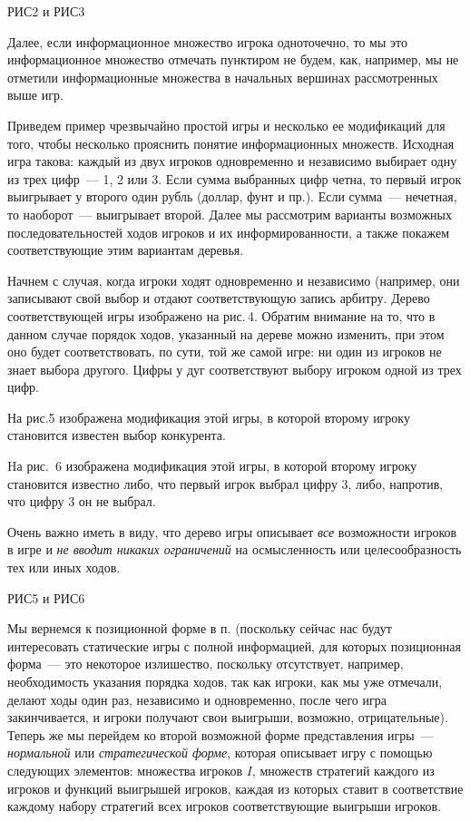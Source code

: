 РИС2 и РИС3



Далее, если информационное множество игрока одноточечно, то мы
это информационное множество отмечать пунктиром не будем, как, например,
мы не отметили информационные множества в начальных вершинах рассмотренных
выше игр.

Приведем пример чрезвычайно простой игры и несколько ее модификаций
для того, чтобы несколько прояснить понятие информационных множеств.
Исходная игра такова: каждый из двух
игроков одновременно и независимо выбирает одну из трех цифр~--- 1, 2 или 3.
Если сумма выбранных цифр четна, то первый игрок выигрывает
у второго один рубль (доллар, фунт и пр.). Если сумма~--- нечетная,
то наоборот~--- выигрывает второй. Далее мы рассмотрим
варианты возможных последовательностей ходов игроков и их информированности,
а также покажем соответствующие этим вариантам деревья.


Начнем с случая, когда игроки ходят одновременно и независимо (например,
они записывают свой выбор и отдают соответствующую запись арбитру.
Дерево соответствующей игры изображено на рис.\,4. Обратим внимание на то, что
в данном случае порядок ходов, указанный на дереве можно изменить, при этом оно
будет соответствовать, по сути, той же самой игре: ни один из игроков не
знает выбора другого. Цифры у дуг соответствуют выбору игроком одной из трех
цифр.

На рис.5 изображена модификация этой игры, в которой второму игроку
становится известен выбор конкурента.

Hа рис.~6 изображена модификация этой игры, в которой второму игроку
становится известно либо, что первый игрок выбрал цифру 3, либо,
напротив, что цифру 3 он не выбрал.

Очень важно иметь в виду, что
дерево игры описывает \emph{все} возможности игроков в игре и \emph{не вводит
никаких ограничений} на осмысленность или целесообразность тех или иных ходов.


РИС5 и РИС6


Мы вернемся к позиционной форме в п.     (поскольку сейчас нас будут
интересовать статические игры с полной информацией, для которых
позиционная форма~--- это некоторое излишество, поскольку отсутствует,
например, необходимость указания порядка ходов, так как игроки, как мы
уже отмечали, делают ходы один раз, независимо и одновременно, после чего
игра закинчивается, и игроки получают свои выигрыши, возможно, отрицательные).
Теперь же мы перейдем ко второй возможной форме представления игры~---
{\it  нормальной} или {\it стратегической форме}, которая описывает игру
с помощью следующих элементов:  множества игроков $I$, множеств стратегий
каждого из игроков и функций выигрышей игроков, каждая из которых ставит
в соответствие каждому набору стратегий всех игроков соответствующие выигрыши
игроков.


